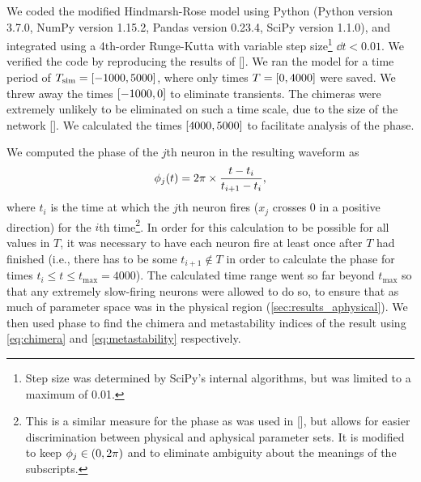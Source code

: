 We coded the modified Hindmarsh-Rose model using Python (Python version 3.7.0, NumPy version 1.15.2, Pandas version 0.23.4, SciPy version 1.1.0), and integrated using a 4th-order Runge-Kutta with variable step size\footnote{Step size was determined by SciPy's internal algorithms, but was limited to a maximum of 0.01.} $\dd{t} < 0.01$.
We verified the code by reproducing the results of [].
We ran the model for a time period of $T_{\text{sim}} = \bqty{-1000, 5000}$, where only times $T = \bqty{0, 4000}$ were saved.
We threw away the times $\bqty{-1000, 0}$ to eliminate transients.
The chimeras were extremely unlikely to be eliminated on such a time scale, due to the size of the network [].
We calculated the times $\bqty{4000, 5000}$ to facilitate analysis of the phase.

We computed the phase of the $j$th neuron in the resulting waveform as
\begin{equation}
  \label{eq:hr_phase}
  \phi_{j}(t)
  =
  2 \pi \times \frac{t - t_{i}}{t_{i + 1} - t_{i}},
\end{equation}
where $t_{i}$ is the time at which the $j$th neuron fires ($x_{j}$ crosses 0 in a positive direction) for the $i$th time\footnote{This is a similar measure for the phase as was used in [], but allows for easier discrimination between physical and aphysical parameter sets.
  It is modified to keep $\phase_{j} \in \pqty{0, 2\pi}$ and to eliminate ambiguity about the meanings of the subscripts.
}.
In order for this calculation to be possible for all values in $T$, it was necessary to have each neuron fire at least once after $T$ had finished (i.e., there has to be some $t_{i + 1} \notin T$ in order to calculate the phase for times $t_{i} \leq t \leq t_{\text{max}} = 4000$).
The calculated time range went so far beyond $t_{\text{max}}$ so that any extremely slow-firing neurons were allowed to do so, to ensure that as much of parameter space was in the physical region (\cref{sec:results_aphysical}).
We then used phase to find the chimera and metastability indices of the result using \cref{eq:chimera} and \cref{eq:metastability} respectively.

